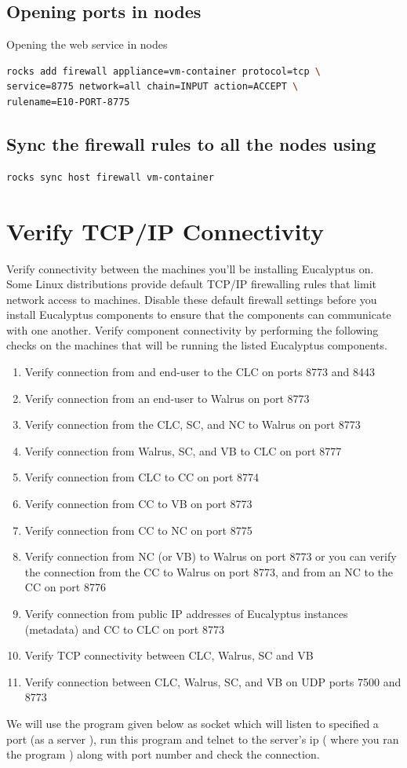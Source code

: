 \subsection{Opening ports in nodes}
Opening the web service in nodes
\begin{lstlisting}[language=bash]
rocks add firewall appliance=vm-container protocol=tcp \
service=8775 network=all chain=INPUT action=ACCEPT \
rulename=E10-PORT-8775
\end{lstlisting}
\subsection{Sync the firewall rules to all the nodes using }
\begin{lstlisting}[language=bash]
rocks sync host firewall vm-container
\end{lstlisting}
\section{Verify TCP/IP Connectivity}

Verify connectivity between the machines you’ll be installing Eucalyptus on. Some Linux distributions provide default TCP/IP firewalling rules that limit network access to machines. Disable these default firewall settings before you install Eucalyptus components to ensure that the components can communicate with one another.
Verify component connectivity by performing the following checks on the machines that will be running the listed Eucalyptus components.
\begin{enumerate}
\item Verify connection from and end-user to the CLC on ports 8773 and 8443
\item Verify connection from an end-user to Walrus on port 8773
\item Verify connection from the CLC, SC, and NC to Walrus on port 8773
\item Verify connection from Walrus, SC, and VB to CLC on port 8777
\item Verify connection from CLC to CC on port 8774
\item Verify connection from CC to VB on port 8773
\item Verify connection from CC to NC on port 8775
\item Verify connection from NC (or VB) to Walrus on port 8773 or you can verify the connection from the CC to Walrus on port 8773, and from an NC to the CC on port 8776
\item Verify connection from public IP addresses of Eucalyptus instances (metadata) and CC to CLC on port 8773
\item Verify TCP connectivity between CLC, Walrus, SC and VB
\item Verify connection between CLC, Walrus, SC, and VB on UDP ports 7500 and 8773

\end{enumerate}
We will use the program given below as socket which will  listen to specified a port (as a server ), run this program and telnet to the server's ip ( where you ran the program ) along with port number and check the connection.


